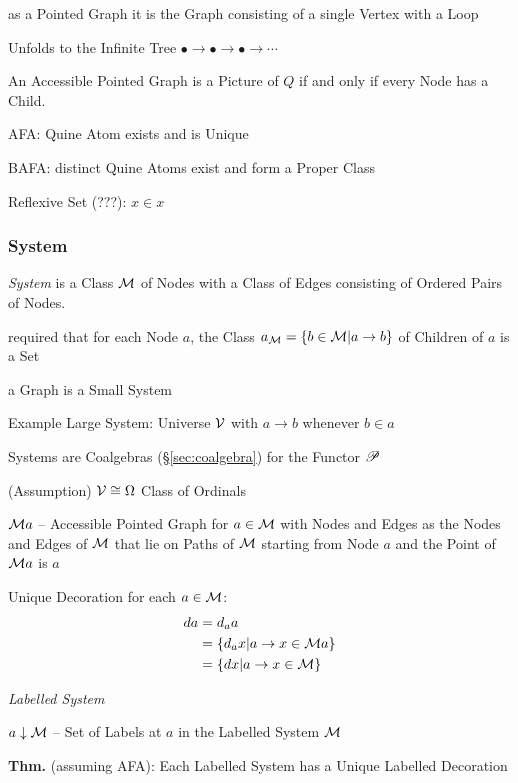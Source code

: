 as a Pointed Graph it is the Graph consisting of a single Vertex with
a Loop

Unfolds to the Infinite Tree $\bullet \rightarrow \bullet
\rightarrow \bullet \rightarrow \cdots$

An Accessible Pointed Graph is a Picture of $Q$ if and only if every
Node has a Child. \cite{aczel88}

AFA: Quine Atom exists and is Unique

BAFA: distinct Quine Atoms exist and form a Proper Class

Reflexive Set (???): $x \in x$



\subsubsection{System}\label{sec:system}
\cite{aczel88}

\emph{System} is a Class $\mathcal{M}$ of Nodes with a Class of Edges
consisting of Ordered Pairs of Nodes.

required that for each Node $a$, the Class $a_\mathcal{M} = \{b \in
\mathcal{M} | a \rightarrow b\}$ of Children of $a$ is a Set

a Graph is a Small System

Example Large System: Universe $\mathcal{V}$ with $a \rightarrow b$
whenever $b \in a$

Systems are Coalgebras (\S\ref{sec:coalgebra}) for the Functor $\mathscr{P}$

(Assumption) $\mathcal{V} \cong \Omega$ Class of Ordinals

$\mathcal{M} a$ -- Accessible Pointed Graph for $a \in \mathcal{M}$ with
Nodes and Edges as the Nodes and Edges of $\mathcal{M}$ that lie on
Paths of $\mathcal{M}$ starting from Node $a$ and the Point of
$\mathcal{M} a$ is $a$

Unique Decoration for each $a \in \mathcal{M}$:
\begin{align*}
  d a &= d_a a \\
      &= \{d_a x | a \rightarrow x \in \mathcal{M} a\} \\
      &= \{d x | a \rightarrow x \in \mathcal{M}\}
\end{align*}

\emph{Labelled System}

$a \downarrow \mathcal{M}$ -- Set of Labels at $a$ in the Labelled
System $\mathcal{M}$

\textbf{Thm.} (assuming AFA): Each Labelled System has a Unique
Labelled Decoration

